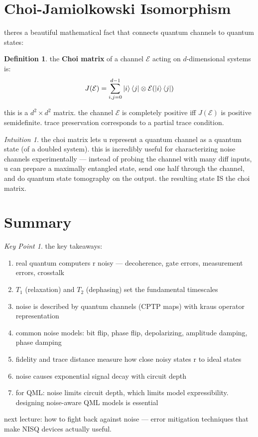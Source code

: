 \documentclass[11pt,a4paper]{article}
\theoremstyle{definition}
\newtheorem{definition}{Definition}[section]
\theoremstyle{remark}
\newtheorem*{intuition}{Intuition}
\newtheorem*{keypoint}{Key Point}
\begin{document}
\section{Choi-Jamiolkowski Isomorphism}

theres a beautiful mathematical fact that connects quantum channels to quantum states:

\begin{definition}
the \textbf{Choi matrix} of a channel $\mathcal{E}$ acting on $d$-dimensional systems is:
\[
J(\mathcal{E}) = \sum_{i,j=0}^{d-1} \ket{i}\bra{j} \otimes \mathcal{E}(\ket{i}\bra{j})
\]
\end{definition}

this is a $d^2 \times d^2$ matrix. the channel $\mathcal{E}$ is completely positive iff $J(\mathcal{E})$ is positive semidefinite. trace preservation corresponds to a partial trace condition.

\begin{intuition}
the choi matrix lets u represent a quantum channel as a quantum state (of a doubled system). this is incredibly useful for characterizing noise channels experimentally --- instead of probing the channel with many diff inputs, u can prepare a maximally entangled state, send one half through the channel, and do quantum state tomography on the output. the resulting state IS the choi matrix.
\end{intuition}

\section{Summary}

\begin{keypoint}
the key takeaways:
\begin{enumerate}
    \item real quantum computers r noisy --- decoherence, gate errors, measurement errors, crosstalk
    \item $T_1$ (relaxation) and $T_2$ (dephasing) set the fundamental timescales
    \item noise is described by quantum channels (CPTP maps) with kraus operator representation
    \item common noise models: bit flip, phase flip, depolarizing, amplitude damping, phase damping
    \item fidelity and trace distance measure how close noisy states r to ideal states
    \item noise causes exponential signal decay with circuit depth
    \item for QML: noise limits circuit depth, which limits model expressibility. designing noise-aware QML models is essential
\end{enumerate}
\end{keypoint}

next lecture: how to fight back against noise --- error mitigation techniques that make NISQ devices actually useful.
\end{document}
